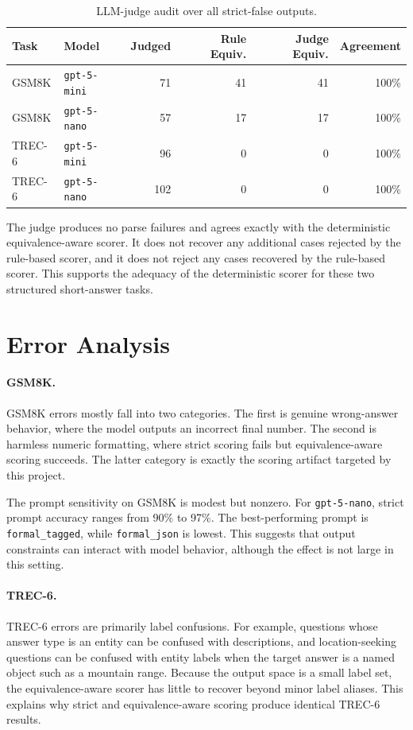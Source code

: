 \documentclass[11pt]{article}
\begin{document}
\begin{table}[h]
\centering
\begin{tabular}{llrrrr}
\toprule
Task & Model & Judged & Rule Equiv. & Judge Equiv. & Agreement \\
\midrule
GSM8K & \texttt{gpt-5-mini} & 71 & 41 & 41 & 100\% \\
GSM8K & \texttt{gpt-5-nano} & 57 & 17 & 17 & 100\% \\
TREC-6 & \texttt{gpt-5-mini} & 96 & 0 & 0 & 100\% \\
TREC-6 & \texttt{gpt-5-nano} & 102 & 0 & 0 & 100\% \\
\bottomrule
\end{tabular}
\caption{LLM-judge audit over all strict-false outputs.}
\label{tab:judge}
\end{table}

The judge produces no parse failures and agrees exactly with the deterministic equivalence-aware scorer. It does not recover any additional cases rejected by the rule-based scorer, and it does not reject any cases recovered by the rule-based scorer. This supports the adequacy of the deterministic scorer for these two structured short-answer tasks.

\section{Error Analysis}

\paragraph{GSM8K.}
GSM8K errors mostly fall into two categories. The first is genuine wrong-answer behavior, where the model outputs an incorrect final number. The second is harmless numeric formatting, where strict scoring fails but equivalence-aware scoring succeeds. The latter category is exactly the scoring artifact targeted by this project.

The prompt sensitivity on GSM8K is modest but nonzero. For \texttt{gpt-5-nano}, strict prompt accuracy ranges from 90\% to 97\%. The best-performing prompt is \texttt{formal\_tagged}, while \texttt{formal\_json} is lowest. This suggests that output constraints can interact with model behavior, although the effect is not large in this setting.

\paragraph{TREC-6.}
TREC-6 errors are primarily label confusions. For example, questions whose answer type is an entity can be confused with descriptions, and location-seeking questions can be confused with entity labels when the target answer is a named object such as a mountain range. Because the output space is a small label set, the equivalence-aware scorer has little to recover beyond minor label aliases. This explains why strict and equivalence-aware scoring produce identical TREC-6 results.
\end{document}
